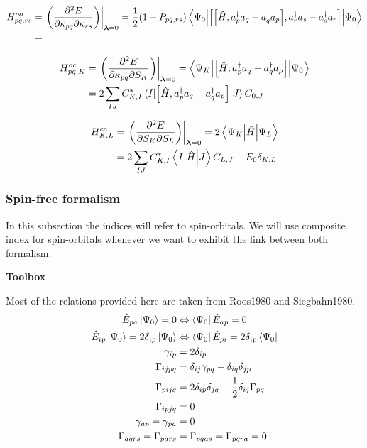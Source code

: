 \documentclass[11pt,a4paper]{article}
\newcommand{\hH}{\Hat{H}} %
\newcommand{\hE}{\Hat{E}} %
\newcommand{\cre}[1]{a_{#1}^\dagger} %
\newcommand{\ani}[1]{a_{#1}} %
\newcommand{\com}[2]{\mleft[#1,#2 \mright]}
\begin{document}
\begin{align}
  \label{eq:MCSCF_SO_OrbOrb_Hessian}
  H^{oo}_{pq,rs} &= \evalat*{\mleft(\pdv{E}{\kappa_{pq}}{\kappa_{rs}}\mright)}{\bm{\lambda}=0} = \frac{1}{2}(1+P_{pq,rs})\mel**{\Psi_0}{\com{\com{\hH}{\cre{p}\ani{q} - \cre{q}\ani{p}}}{\cre{r}\ani{s} - \cre{s}\ani{r}}}{\Psi_0} \\
  &= \notag
\end{align}

\begin{align}
  \label{eq:MCSCF_SO_CIOrb_Hessian}
  H^{oc}_{pq,K} &= \evalat*{\mleft(\pdv{E}{\kappa_{pq}}{S_{K}}\mright)}{\bm{\lambda}=0} = \mel**{\Psi_K}{\com{\hH}{\cre{p}\ani{q} - \cre{q}\ani{p}}}{\Psi_0} \\
  &= 2\sum_{IJ}C_{K,I}^*\mel{I}{\com{\hH}{\cre{p}\ani{q} - \cre{q}\ani{p}}}{J}C_{0,J} \notag
\end{align}

\begin{align}
  \label{eq:MCSCF_SO_CIOrb_Hessian}
  H^{cc}_{K,L} &= \evalat*{\mleft(\pdv{E}{S_{K}}{S_{L}}\mright)}{\bm{\lambda}=0} = 2\mel**{\Psi_K}{\hH}{\Psi_L} \\
  &= 2\sum_{IJ}C_{K,I}^*\mel**{I}{\hH}{J}C_{L,J} - E_0\delta_{K,L} \notag
\end{align}

\subsubsection{Spin-free formalism}

In this subsection the indices will refer to spin-orbitals. We will use composite index for spin-orbitals whenever we want to exhibit the link between both formalism.

\noindent\textbf{Toolbox}

Most of the relations provided here are taken from Roos1980 and Siegbahn1980.
\begin{align}
  \hE_{pa}\ket{\Psi_0} =0  &\Leftrightarrow \bra{\Psi_0}\hE_{ap} = 0 \\
  \hE_{ip}\ket{\Psi_0} =2\delta_{ip}\ket{\Psi_0} &\Leftrightarrow \bra{\Psi_0}\hE_{pi}=2\delta_{ip}\bra{\Psi_0 } \\
  \gamma_{ip}&=2\delta_{ip} \\
  \Gamma_{ijpq}&= \delta_{ij}\gamma_{pq} -\delta_{iq}\delta_{jp} \\
  \Gamma_{pijq}&= 2\delta_{ip}\delta_{jq} - \frac{1}{2}\delta_{ij}\Gamma_{pq} \\
  \Gamma_{ipjq}&=0 \\
  \gamma_{ap} = \gamma_{pa} &= 0 \\
  \Gamma_{aqrs} = \Gamma_{pars} &= \Gamma_{pqas} = \Gamma_{pqra} = 0
\end{align}
\end{document}
